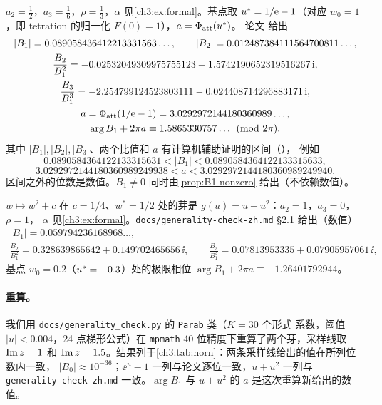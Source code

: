 \begin{example}\label{ch3:ex:exp}
$a_2=\tfrac12$，$a_3=\tfrac16$，$\rho=\tfrac13$，$\alpha$ 见\cref{ch3:ex:formal}。基点取
$u^{*}=1/\mathrm{e}-1$（对应 $w_0=1$，即 tetration 的归一化 $F(0)=1$），$a=\Phi_{\mathrm{att}}(u^{*})$。
论文 \cite[\S2.1]{KneserPaper} 给出
\begin{gather*}
 |B_1|=0.089058436412213331563\ldots,\qquad |B_2|=0.012487384111564700811\ldots,\\
 \frac{B_2}{B_1^2}=-0.02532049309975755123+1.5742190652319516267\,\mathrm{i},\\
 \frac{B_3}{B_1^3}=-2.254799124523803111-0.024408714296883171\,\mathrm{i},\\
 a=\Phi_{\mathrm{att}}(1/\mathrm{e}-1)=3.0292972144180360989\ldots,\\
 \arg B_1+2\pi a\equiv1.5865330757\ldots\pmod{2\pi}.
\end{gather*}
其中 $|B_1|,|B_2|,|B_3|$、两个比值和 $a$ 有计算机辅助证明的区间（\cite[Prop.~2.6 与附录 A]{KneserPaper}），
例如
\[
 0.0890584364122133315631<|B_1|<0.0890584364122133315633,
\]
\[
 3.0292972144180360989249938<a<3.0292972144180360989249940 .
\]
区间之外的位数是数值。$B_1\ne0$ 同时由\cref{prop:B1-nonzero} 给出（不依赖数值）。
\end{example}

\begin{example}[$u+u^2$：二次族的抛物芽]\label{ch3:ex:quad}
$w\mapsto w^2+c$ 在 $c=1/4$、$w^*=1/2$ 处的芽是 $g(u)=u+u^2$：$a_2=1$，$a_3=0$，$\rho=1$，
$\alpha$ 见\cref{ch3:ex:formal}。\texttt{docs/generality-check-zh.md} §2.1 给出（数值）
\begin{gather*}
 |B_1|=0.059794236168968\ldots,\\
 \frac{B_2}{B_1^2}=0.328639865642+0.149702465656\,\ii,\qquad
 \frac{B_3}{B_1^3}=0.07813953335+0.07905957061\,\ii,
\end{gather*}
基点 $w_0=0.2$（$u^{*}=-0.3$）处的极限相位 $\arg B_1+2\pi a\equiv-1.26401792944$。
\end{example}

\paragraph{重算。} 我们用 \texttt{docs/generality\_check.py} 的 \texttt{Parab} 类（$K=30$ 个形式
系数，阈值 $|u|<0.004$，24 点梯形公式）在 \texttt{mpmath} 40 位精度下重算了两个芽，采样线取
$\operatorname{Im} z=1$ 和 $\operatorname{Im} z=1.5$。结果列于\cref{ch3:tab:horn}：两条采样线给出的值在所列位数内一致，
$|B_0|\approx10^{-36}$；$\ee^u-1$ 一列与论文逐位一致，$u+u^2$ 一列与
\texttt{generality-check-zh.md} 一致。$\arg B_1$ 与 $u+u^2$ 的 $a$ 是这次重算新给出的数值。


